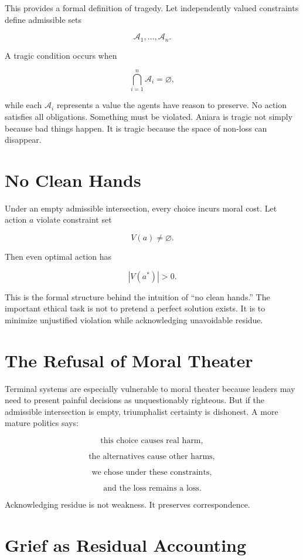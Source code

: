 \documentclass[11pt,oneside]{book}
\theoremstyle{definition}
\theoremstyle{remark}
\newcommand{\A}{\mathcal{A}}
\begin{document}
This provides a formal definition of tragedy. Let independently valued constraints define admissible
sets

\[
\A_1,\ldots,\A_n.
\]

A tragic condition occurs when

\[
\bigcap_{i=1}^{n}\A_i = \varnothing,
\]

while each \(\A_i\) represents a value the agents have reason to preserve. No action satisfies all
obligations. Something must be violated. Aniara is tragic not simply because bad things happen. It
is tragic because the space of non-loss can disappear.

\section{No Clean Hands}

Under an empty admissible intersection, every choice incurs moral cost. Let action \(a\) violate
constraint set

\[
V(a)\neq\varnothing.
\]

Then even optimal action has

\[
|V(a^\ast)|>0.
\]

This is the formal structure behind the intuition of ``no clean hands.'' The important ethical task
is not to pretend a perfect solution exists. It is to minimize unjustified violation while
acknowledging unavoidable residue.

\section{The Refusal of Moral Theater}

Terminal systems are especially vulnerable to moral theater because leaders may need to present
painful decisions as unquestionably righteous. But if the admissible intersection is empty,
triumphalist certainty is dishonest. A more mature politics says:

\[
\text{this choice causes real harm},
\]

\[
\text{the alternatives cause other harms},
\]

\[
\text{we chose under these constraints},
\]

\[
\text{and the loss remains a loss}.
\]

Acknowledging residue is not weakness. It preserves correspondence.

\section{Grief as Residual Accounting}
\end{document}
